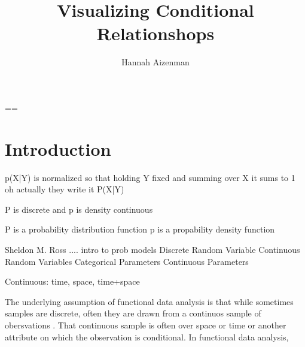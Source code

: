==\documentclass[letterpaper,onecolumn,titlepage]{Ythesis}
\title{Visualizing Conditional Relationshops}
\author{Hannah Aizenman}
\begin{document}
\makefrontmatter

\section{Introduction}
\label{sec:introduction}
p(X|Y) is normalized so that holding Y fixed and summing over X it sums to 1 oh
actually they write it P(X|Y)

P is discrete and p is density continuous

P is a probability distribution function p is a propability density function

Sheldon M. Ross .... intro to prob models
Discrete Random Variable Continuous Random Variables
Categorical Parameters
Continuous Parameters

Continuous: time, space, time+space


The underlying assumption of functional data analysis is that while sometimes
samples are discrete, often they are drawn from a continuos sample of
obersvations \cite{ramsey2006, ramsey2002, muller2006}. That continuous sample is often over
space or time or another attribute on which the observation is conditional. In
functional data analysis,
\end{document}
